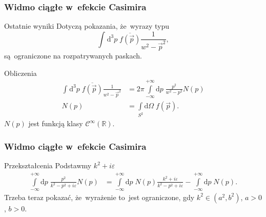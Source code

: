 \documentclass{beamer} \mode<presentation>
\newcommand{\fr}{\frac}
\newcommand{\ol}{\overline}
\newcommand{\mr}{\mathrm}
\newcommand{\mb}{\mathbb}
\newcommand{\mc}{\mathcal}
\newcommand{\veps}{\varepsilon}
\newcommand{\Om}{\Omega}
\newcommand{\R}{\mb{R}}
\newcommand{\Cc}{\mc{C}}
\newcommand{\de}{\mr{d}}
\newcommand{\Int}{\int\limits}
\newcommand{\IntA}[1]{\Int_{ -\infty }^{ +\infty } \de #1 \;}
\newcommand{\IntWie}[3]{ \int_{ #1 } \de^{ #2 }#3 \; } %
\newcommand{\Cinfty}{\Cc^{ \infty }}
\newcommand{\vecp}{\vec{ p }}
\begin{document}
\begin{frame}
  \frametitle{Widmo ciągłe w~efekcie Casimira}

  \begin{block}{Ostatnie wyniki}
    Dotyczą pokazania, że~wyrazy typu
    \begin{equation}
      \label{eq:21}
      \IntWie{}{ 3 }{ p } \ol{ f( \vecp ) } \fr{ 1 }{ w^{ 2 }
        - \vecp^{ 2 } },
    \end{equation}
    są~ograniczone na rozpatrywanych paskach.
  \end{block}

  \begin{block}{Obliczenia}
    \begin{align}
      \label{eq:22}
      \IntWie{}{ 3 }{ p } \ol{ f( \vecp ) } \fr{ 1 }{ w^{ 2 }
      - \vecp^{ 2 } } &= 2 \pi \IntA{ p } \fr{ p^{ 2 } }{ w^{ 2 }
                        - p^{ 2 } } N( p ) \\
      N( p ) &= \Int_{ S^{ 2 } } \de \Om \; f( \vecp ).
    \end{align}
    $N( p )$ jest funkcją klasy $\Cinfty( \R )$.
  \end{block}
  
\end{frame}



\begin{frame}
  \frametitle{Widmo ciągłe w~efekcie Casimira}

  \begin{block}{Przekształcenia}
    Podstawmy $k^{ 2 } + i \veps$
    \begin{equation}
      \label{eq:22}
      \begin{split}
        \IntA{ p } \fr{ p^{ 2 } }{ k^{ 2 } - p^{ 2 } + i \veps } N( p
        ) &= \IntA{ p } N( p ) \fr{ k^{ 2 } + i \veps }{ k^{ 2 } - p^{
            2 } + i \veps } - \IntA{ p } N( p ).
      \end{split}
    \end{equation}
    Trzeba teraz pokazać, że~wyrażenie to~jest ograniczone, gdy
    $k^{ 2 } \in ( a^{ 2 }, b^{ 2 })$, $a > 0$, $b > 0$.
  \end{block}

\end{frame}
\end{document}
